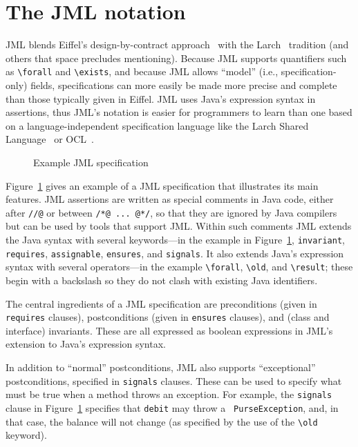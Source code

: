 \documentclass{entcs}
\begin{document}
\section{The JML notation}
\label{notation}

JML blends Eiffel's design-by-contract approach~\cite{Meyer97} with
the Larch~\cite{Guttag-Horning93} tradition (and others that space
precludes mentioning).  Because JML supports quantifiers such as
\verb_\forall_ and \verb_\exists_, and because JML allows ``model''
(i.e., specification-only) fields, specifications can more easily be
made more precise and complete than those typically given in
Eiffel. JML uses Java's 
expression syntax in assertions, thus JML's notation is easier for
programmers to learn than one based on a language-independent
specification language like the Larch Shared
Language~\cite{Leavens-Baker-Ruby03,Leavens-etal03a} or
OCL~\cite{WarmerKleppe99}.


\begin{figure}
{\small
}
\caption{\label{example}Example JML specification}
\end{figure}

Figure~\ref{example} gives an example of a JML specification that
illustrates its main features.
JML assertions are written as special comments in Java code,
either after \verb_//@_ or between \verb_/*@ ... @*/_, so that they
are ignored by Java compilers but can be used by tools that support
JML\@.
Within such comments JML extends the Java syntax with several keywords---in 
the example in Figure~\ref{example}, {\tt invariant}, {\tt requires},
{\tt assignable}, {\tt ensures}, and {\tt signals}.
It also extends Java's expression syntax with several operators---in
the example  \verb_\forall_, \verb_\old_, and \verb_\result_;
these begin with a backslash so they do not clash with existing
Java identifiers.

The central ingredients of a JML specification are preconditions
(given in {\tt requires} clauses),
postconditions (given in {\tt ensures} clauses),
and (class and interface) invariants.  These are all expressed as
boolean expressions in JML's extension to Java's expression syntax.

In addition to ``normal'' postconditions, JML also supports
``exceptional'' postconditions, specified in {\tt signals} clauses.
These can be used to specify what must be true when a method throws an
exception.  For example, the {\tt signals} clause in
Figure~\ref{example} specifies that {\tt debit} may throw a {\tt
  PurseException}, and, in that case, the balance will not change (as
specified by the use of the \verb+\old+ keyword).
\end{document}
